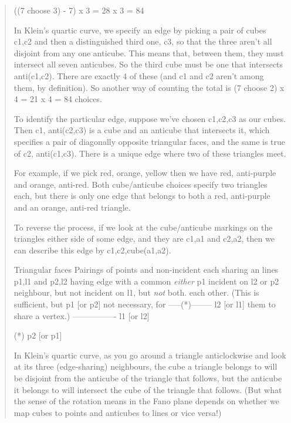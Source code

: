 \begin{quote}
                           ((7 choose 3) - 7) x 3 = 28 x 3 = 84

In Klein's quartic curve, we specify an edge by picking a pair of cubes 
{c1,c2} and then a distinguished third one, c3, so that the three aren't 
all disjoint from any one anticube.  This means that, between them, they 
must intersect all seven anticubes.  So the third cube must be one that 
intersects anti({c1,c2}).  There are exactly 4 of these (and c1 and c2 
aren't among them, by definition).  So another way of counting the total 
is (7 choose 2) x 4 = 21 x 4 = 84 choices.

To identify the particular edge, suppose we've chosen {{c1,c2},c3} as our 
cubes.  Then {c1, anti({c2,c3})} is a cube and an anticube that 
intersects it, which specifies a pair of diagonally opposite triangular 
faces, and the same is true of {c2, anti({c1,c3})}.  There is a unique 
edge where two of these triangles meet.

For example, if we pick {{red, orange}, yellow} then we have {red, 
anti-purple} and {orange, anti-red}.  Both cube/anticube choices specify 
two triangles each, but there is only one edge that belongs to both a 
{red, anti-purple} and an {orange, anti-red} triangle.

To reverse the process, if we look at the cube/anticube markings on the 
triangles either side of some edge, and they are {c1,a1} and {c2,a2}, 
then we can describe this edge by {{c1,c2},cube({a1,a2})}.

Triangular faces             Pairings of points and non-incident
each sharing an              lines {p1,l1} and {p2,l2} having
edge with a common           \emph{either} p1 incident on l2 or p2
neighbour, but not           incident on l1, but \emph{not} both.
each other.  (This
is sufficient, but                p1 [or p2]
not necessary, for           -----(*)-------- l2 [or l1]
them to share a
vertex.)                     ---------------- l1 [or l2]

                                  (*)
                                  p2 [or p1]

In Klein's quartic curve, as you go around a triangle anticlockwise and 
look at its three (edge-sharing) neighbours, the cube a triangle belongs 
to will be disjoint from the anticube of the triangle that follows, but 
the anticube it belongs to will intersect the cube of the triangle that 
follows.  (But what the sense of the rotation means in the Fano plane 
depends on whether we map cubes to points and anticubes to lines or vice 
versa!) 



\end{quote}
